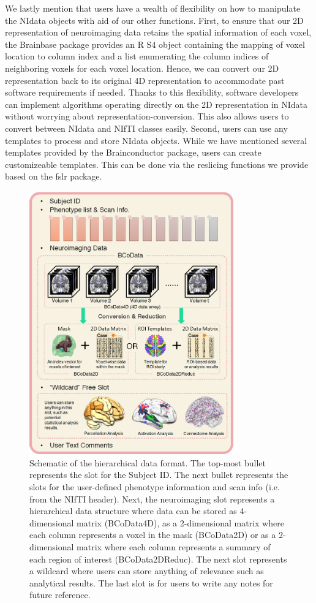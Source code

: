 \documentclass{nature}
\begin{document}
We lastly mention that users have a wealth of flexibility on how to manipulate the NIdata
objects with aid of our other functions. 
First, to ensure that our 2D representation of neuroimaging data retains the
spatial information of each voxel, the Brainbase package provides
an R S4 object containing the mapping of voxel location to column index and
a list enumerating the column indices of neighboring voxels for each voxel
location. Hence, we can convert our 2D representation back to its original
4D representation to accommodate past software requirements if needed.
Thanks to this flexibility, software developers can
implement algorithms operating directly on the 2D representation in
NIdata without worrying about representation-conversion. This also allows users 
to convert between NIdata and NIfTI classes easily. Second, users can use any
templates to process and store NIdata objects. While we have mentioned several templates
provided by the Brainconductor package, users can create customizeable templates. 
This can be done via the reslicing
functions
we provide based on the fslr package. 

\begin{figure}[tb]
\centering
\includegraphics[width=250pt]{fig/brainconductor/NIdata.png}
\caption{Schematic of the hierarchical data format. The top-most bullet represents
the slot for the Subject ID. The next bullet represents the slots for the user-defined
phenotype information and scan info (i.e. from the NIfTI header). Next, the neuroimaging
slot represents a hierarchical data structure where data can be stored as 4-dimensional
matrix (BCoData4D), as a 2-dimensional matrix where each column represents a voxel in
the mask (BCoData2D) or as a 2-dimensional matrix where each column represents a
summary of each region of interest (BCoData2DReduc). The next slot represents a wildcard
where users can store anything of relevance such as analytical results. The last
slot is for users to write any notes for future reference.}
\label{fig:fileformat}
\end{figure}
\end{document}
